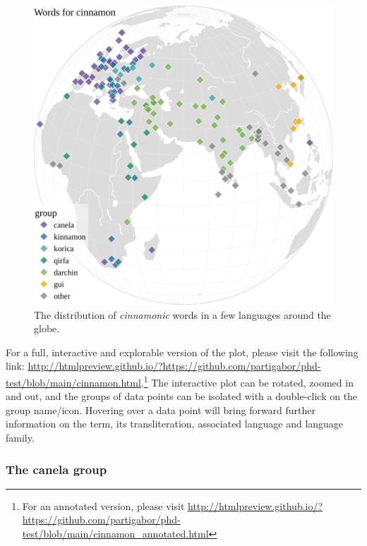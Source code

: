 \begin{figure}[!ht]
    \centering
    \includegraphics[width=\linewidth]{imgs/plots/distribution_cinnamon.pdf}
    \caption{The distribution of \textit{cinnamonic} words in a few languages around the globe.}
    \label{fig:cinnamon_distribution}
\end{figure}

\begin{note}
For a full, interactive and explorable version of the plot, please visit the following link: \url{http://htmlpreview.github.io/?https://github.com/partigabor/phd-test/blob/main/cinnamon.html}.\footnote{For an annotated version, please visit \url{http://htmlpreview.github.io/?https://github.com/partigabor/phd-test/blob/main/cinnamon_annotated.html}} The interactive plot can be rotated, zoomed in and out, and the groups of data points can be isolated with a double-click on the group name/icon. Hovering over a data point will bring forward further information on the term, its transliteration, associated language and language family.
\end{note}

\subsubsection{The canela group}

